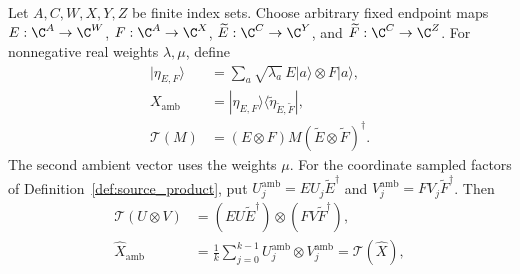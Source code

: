 \begin{definition}
    \label{def:reduction_ambient_transport}
    \leanok
    Let $A,C,W,X,Y,Z$ be finite index sets. Choose arbitrary fixed endpoint
    maps $E:\C^A\to\C^W$, $F:\C^A\to\C^X$,
    $\widetilde E:\C^C\to\C^Y$, and
    $\widetilde F:\C^C\to\C^Z$.
    For nonnegative real weights $\lambda,\mu$, define
    \begin{align}
        |\eta_{E,F}\rangle
                      & =\sum_a\sqrt{\lambda_a}\,E|a\rangle\otimes F|a\rangle,
        \label{eq:reduction_ambient_vector}                                                    \\
        X_{\mathrm{amb}}
                      & =|\eta_{E,F}\rangle\langle\widetilde\eta_{\widetilde E,\widetilde F}|,
        \label{eq:reduction_ambient_target}                                                    \\
        \mathcal T(M) & =(E\otimes F)M(\widetilde E\otimes\widetilde F)^\dagger.
        \label{eq:reduction_ambient_transport}
    \end{align}
    The second ambient vector uses the weights $\mu$.
    For the coordinate sampled factors of Definition~\ref{def:source_product},
    put $U_j^{\mathrm{amb}}=EU_j\widetilde E^\dagger$ and
    $V_j^{\mathrm{amb}}=FV_j\widetilde F^\dagger$. Then
    \begin{align}
        \mathcal T(U\otimes V)
                         & =(EU\widetilde E^\dagger)\otimes(FV\widetilde F^\dagger),
        \label{eq:reduction_ambient_product}                                                    \\
        \widehat X_{\mathrm{amb}}
                         & =\frac1k\sum_{j=0}^{k-1}U_j^{\mathrm{amb}}\otimes V_j^{\mathrm{amb}}
        =\mathcal T(\widehat X),
        \label{eq:reduction_ambient_sample}                                                     \\

\end{align}
\end{definition}

